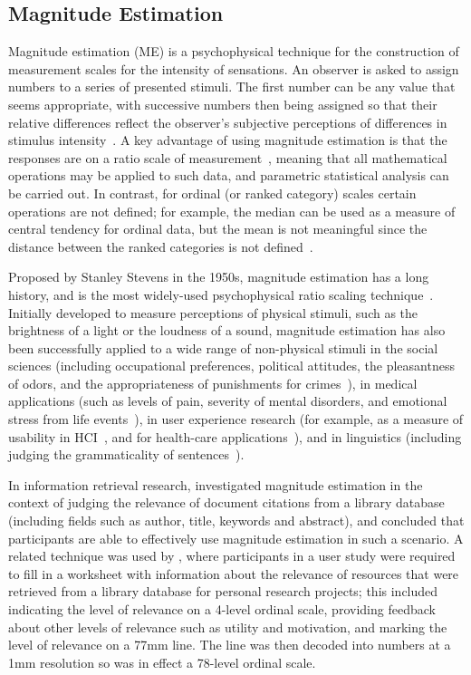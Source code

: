 \subsection{Magnitude Estimation} 

Magnitude estimation (ME) is a psychophysical technique for the construction
of measurement scales for the intensity of sensations.
An observer is asked to assign numbers to a series of presented
stimuli.
The first number can be any value that seems appropriate, with
successive numbers then being assigned so that their relative
differences reflect the observer's subjective perceptions of
differences in stimulus intensity~\citep{EhrEhr99}.
A key advantage of using magnitude estimation is that the responses are
on a ratio scale of measurement~\citep{Ges97}, meaning that all mathematical operations
may be applied to such data, and parametric statistical analysis
can be carried out.
In contrast, for ordinal (or ranked category) scales certain operations
are not defined; for example, the median can be used as a measure of
central tendency for ordinal data, but the mean is not meaningful since
the distance between the ranked categories is not defined~\citep{She07}.

Proposed by Stanley Stevens in the 1950s, magnitude estimation
has a long history, and is the most widely-used psychophysical
ratio scaling technique~\cite{Ges97}.
Initially developed to measure perceptions of physical stimuli, such as
the brightness of a light or the loudness of a sound, magnitude
estimation has also been successfully applied to a wide range of
non-physical stimuli in the social sciences (including occupational
preferences, political attitudes, the pleasantness of odors, and the
appropriateness of punishments for crimes~\citep{Ste66}), in medical
applications (such as levels of pain, severity of mental disorders, and
emotional stress from life events~\citep{Ges97}), in user experience
research (for example, as a measure of usability in HCI~\citep{McG03},
and for health-care applications~\citep{Joh10}), and in linguistics
(including judging the grammaticality of sentences~\citep{BarRob96}).

In information retrieval research, 
\citet{Eis88} investigated magnitude estimation in the context of
judging the relevance of document citations from a library database
(including fields such as author, title, keywords and abstract), and
concluded that participants are able to effectively use magnitude
estimation in such a scenario.
A related technique was used by 
\citet{SpiGre01}, where
participants in a user study were required to fill in a worksheet with
information about the relevance of resources that were retrieved from a
library database for personal research projects; this included
indicating the level of relevance on a 4-level ordinal scale, providing
feedback about other levels of relevance such as utility and
motivation, and marking the level of relevance on a 77mm line.
The line was then decoded into numbers at a 1mm resolution
so was in effect a 78-level ordinal scale.

